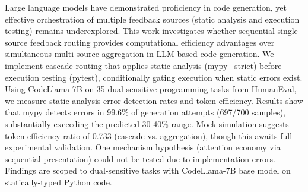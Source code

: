 
Large language models have demonstrated proficiency in code generation, yet effective orchestration of multiple feedback sources (static analysis and execution testing) remains underexplored. This work investigates whether sequential single-source feedback routing provides computational efficiency advantages over simultaneous multi-source aggregation in LLM-based code generation. We implement cascade routing that applies static analysis (mypy --strict) before execution testing (pytest), conditionally gating execution when static errors exist. Using CodeLlama-7B on 35 dual-sensitive programming tasks from HumanEval, we measure static analysis error detection rates and token efficiency. Results show that mypy detects errors in 99.6\% of generation attempts (697/700 samples), substantially exceeding the predicted 30-40\% range. Mock simulation suggests token efficiency ratio of 0.733 (cascade vs. aggregation), though this awaits full experimental validation. One mechanism hypothesis (attention economy via sequential presentation) could not be tested due to implementation errors. Findings are scoped to dual-sensitive tasks with CodeLlama-7B base model on statically-typed Python code.
